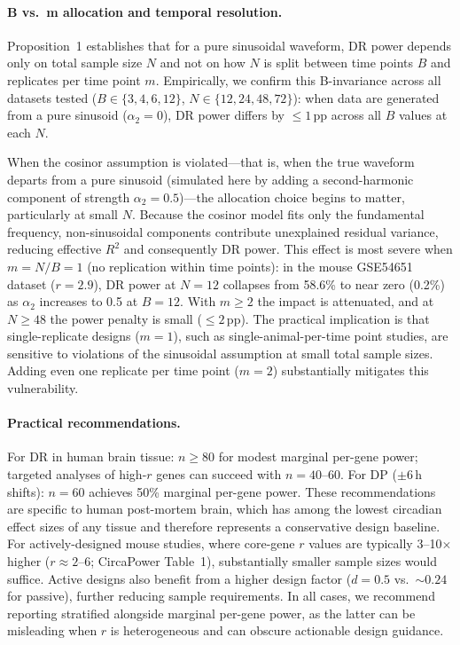 \documentclass{article}
\begin{document}
\paragraph{B vs.\ m allocation and temporal resolution.} Proposition~1 establishes that for a pure sinusoidal waveform, DR power depends only on total sample size $N$ and not on how $N$ is split between time points $B$ and replicates per time point $m$. Empirically, we confirm this B-invariance across all datasets tested ($B \in \{3, 4, 6, 12\}$, $N \in \{12, 24, 48, 72\}$): when data are generated from a pure sinusoid ($\alpha_2 = 0$), DR power differs by $\leq 1$\,pp across all $B$ values at each $N$.

When the cosinor assumption is violated---that is, when the true waveform departs from a pure sinusoid (simulated here by adding a second-harmonic component of strength $\alpha_2 = 0.5$)---the allocation choice begins to matter, particularly at small $N$. Because the cosinor model fits only the fundamental frequency, non-sinusoidal components contribute unexplained residual variance, reducing effective $R^2$ and consequently DR power. This effect is most severe when $m = N/B = 1$ (no replication within time points): in the mouse GSE54651 dataset ($r = 2.9$), DR power at $N = 12$ collapses from 58.6\% to near zero (0.2\%) as $\alpha_2$ increases to 0.5 at $B = 12$. With $m \geq 2$ the impact is attenuated, and at $N \geq 48$ the power penalty is small ($\leq 2$\,pp). The practical implication is that single-replicate designs ($m = 1$), such as single-animal-per-time point studies, are sensitive to violations of the sinusoidal assumption at small total sample sizes. Adding even one replicate per time point ($m = 2$) substantially mitigates this vulnerability.

\paragraph{Practical recommendations.} For DR in human brain tissue: $n \geq 80$ for modest marginal per-gene power; targeted analyses of high-$r$ genes can succeed with $n = 40$--60. For DP ($\pm$6\,h shifts): $n = 60$ achieves 50\% marginal per-gene power. These recommendations are specific to human post-mortem brain, which has among the lowest circadian effect sizes of any tissue \cite{zong2023circapower} and therefore represents a conservative design baseline. For actively-designed mouse studies, where core-gene $r$ values are typically 3--10$\times$ higher ($r \approx 2$--$6$; CircaPower Table~1), substantially smaller sample sizes would suffice. Active designs also benefit from a higher design factor ($d = 0.5$ vs.\ ${\sim}0.24$ for passive), further reducing sample requirements. In all cases, we recommend reporting stratified alongside marginal per-gene power, as the latter can be misleading when $r$ is heterogeneous and can obscure actionable design guidance.
\end{document}
